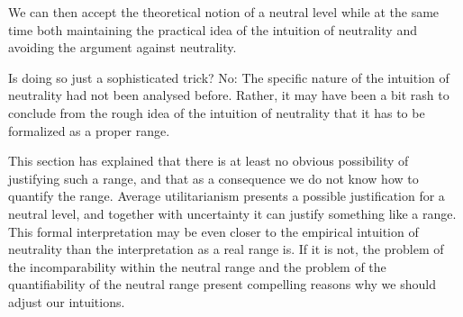 We can then accept the theoretical notion of a neutral level while at the same time both maintaining the practical idea of the intuition of neutrality and avoiding the argument against neutrality. 

Is doing so just a sophisticated trick? No: The specific nature of the intuition of neutrality had not been analysed before. Rather, it may have been a bit rash to conclude from the rough idea of the intuition of neutrality that it has to be formalized as a proper range. 

This section has explained that there is at least no obvious possibility of justifying such a range, and that as a consequence we do not know how to quantify the range. Average utilitarianism presents a possible justification for a neutral level, and together with uncertainty it can justify something like a range. This formal interpretation may be even closer to the empirical intuition of neutrality than the interpretation as a real range is. If it is not, the problem of the incomparability within the neutral range and the problem of the quantifiability of the neutral range present compelling reasons why we should adjust our intuitions.  